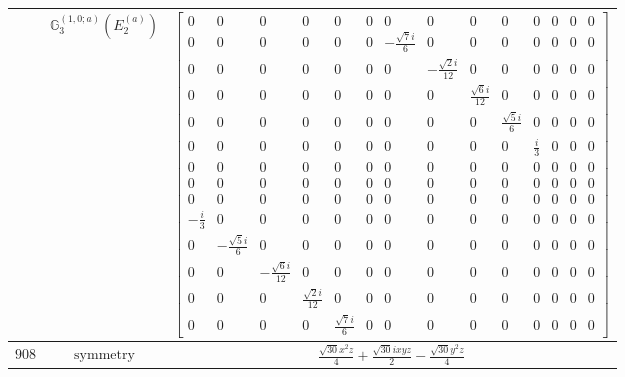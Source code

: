 \documentclass[fleqn,8pt,landscape]{jsarticle}
\begin{document}
\begin{longtable}{ccc}
$  $ & $ \mathbb{G}_{3}^{(1,0;a)}(E_{2}^{(a)}) $ & $ \begin{bmatrix} 0 & 0 & 0 & 0 & 0 & 0 & 0 & 0 & 0 & 0 & 0 & 0 & 0 & 0 \\ 0 & 0 & 0 & 0 & 0 & 0 & - \frac{\sqrt{7} i}{6} & 0 & 0 & 0 & 0 & 0 & 0 & 0 \\ 0 & 0 & 0 & 0 & 0 & 0 & 0 & - \frac{\sqrt{2} i}{12} & 0 & 0 & 0 & 0 & 0 & 0 \\ 0 & 0 & 0 & 0 & 0 & 0 & 0 & 0 & \frac{\sqrt{6} i}{12} & 0 & 0 & 0 & 0 & 0 \\ 0 & 0 & 0 & 0 & 0 & 0 & 0 & 0 & 0 & \frac{\sqrt{5} i}{6} & 0 & 0 & 0 & 0 \\ 0 & 0 & 0 & 0 & 0 & 0 & 0 & 0 & 0 & 0 & \frac{i}{3} & 0 & 0 & 0 \\ 0 & 0 & 0 & 0 & 0 & 0 & 0 & 0 & 0 & 0 & 0 & 0 & 0 & 0 \\ 0 & 0 & 0 & 0 & 0 & 0 & 0 & 0 & 0 & 0 & 0 & 0 & 0 & 0 \\ 0 & 0 & 0 & 0 & 0 & 0 & 0 & 0 & 0 & 0 & 0 & 0 & 0 & 0 \\ - \frac{i}{3} & 0 & 0 & 0 & 0 & 0 & 0 & 0 & 0 & 0 & 0 & 0 & 0 & 0 \\ 0 & - \frac{\sqrt{5} i}{6} & 0 & 0 & 0 & 0 & 0 & 0 & 0 & 0 & 0 & 0 & 0 & 0 \\ 0 & 0 & - \frac{\sqrt{6} i}{12} & 0 & 0 & 0 & 0 & 0 & 0 & 0 & 0 & 0 & 0 & 0 \\ 0 & 0 & 0 & \frac{\sqrt{2} i}{12} & 0 & 0 & 0 & 0 & 0 & 0 & 0 & 0 & 0 & 0 \\ 0 & 0 & 0 & 0 & \frac{\sqrt{7} i}{6} & 0 & 0 & 0 & 0 & 0 & 0 & 0 & 0 & 0 \end{bmatrix} $ \\ \hline
$ 908 $ & $ \text{symmetry} $ & $ \frac{\sqrt{30} x^{2} z}{4} + \frac{\sqrt{30} i x y z}{2} - \frac{\sqrt{30} y^{2} z}{4} $ \\

\end{longtable}
\end{document}
